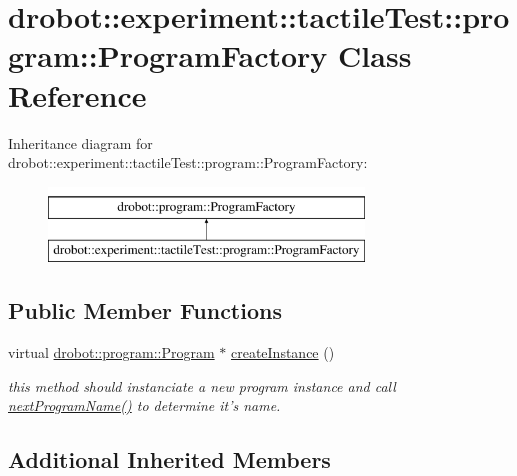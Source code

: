 \hypertarget{classdrobot_1_1experiment_1_1tactileTest_1_1program_1_1ProgramFactory}{\section{drobot\-:\-:experiment\-:\-:tactile\-Test\-:\-:program\-:\-:Program\-Factory Class Reference}
\label{classdrobot_1_1experiment_1_1tactileTest_1_1program_1_1ProgramFactory}
}
Inheritance diagram for drobot\-:\-:experiment\-:\-:tactile\-Test\-:\-:program\-:\-:Program\-Factory\-:\begin{figure}[H]
\begin{center}
\leavevmode
\includegraphics[height=2.000000cm]{classdrobot_1_1experiment_1_1tactileTest_1_1program_1_1ProgramFactory}
\end{center}
\end{figure}
\subsection*{Public Member Functions}
\begin{DoxyCompactItemize}
\item 
virtual \hyperlink{classdrobot_1_1program_1_1Program}{drobot\-::program\-::\-Program} $\ast$ \hyperlink{classdrobot_1_1experiment_1_1tactileTest_1_1program_1_1ProgramFactory_a8a240e973d00cc0cb5389bddd3b927c8}{create\-Instance} ()
\begin{DoxyCompactList}\small\item\em this method should instanciate a new program instance and call \hyperlink{classdrobot_1_1program_1_1ProgramFactory_afba61329928433e93b8cede0d892a55e}{next\-Program\-Name()} to determine it's name. \end{DoxyCompactList}\end{DoxyCompactItemize}
\subsection*{Additional Inherited Members}


